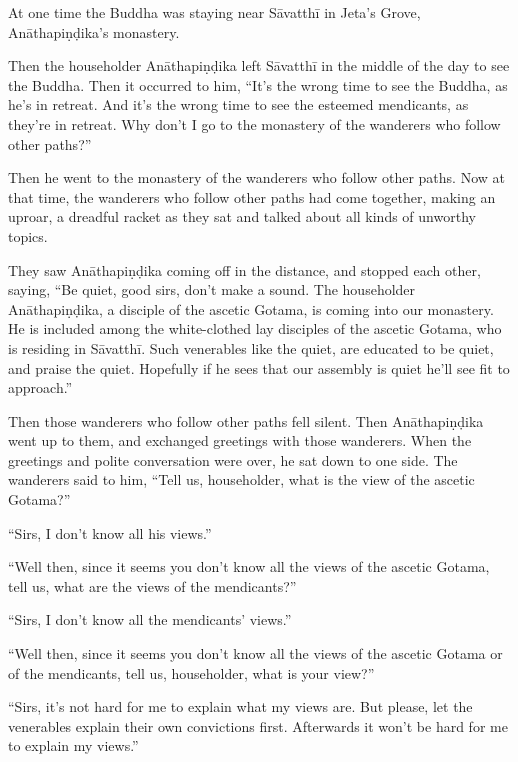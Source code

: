 \documentclass[12pt,openany]{book}%
\begin{document}
At one time the Buddha was staying near \textsanskrit{Sāvatthī} in Jeta’s Grove, \textsanskrit{Anāthapiṇḍika}’s monastery. 

Then the householder \textsanskrit{Anāthapiṇḍika} left \textsanskrit{Sāvatthī} in the middle of the day to see the Buddha. Then it occurred to him, “It’s the wrong time to see the Buddha, as he’s in retreat. And it’s the wrong time to see the esteemed mendicants, as they’re in retreat. Why don’t I go to the monastery of the wanderers who follow other paths?” 

Then he went to the monastery of the wanderers who follow other paths. Now at that time, the wanderers who follow other paths had come together, making an uproar, a dreadful racket as they sat and talked about all kinds of unworthy topics. 

They saw \textsanskrit{Anāthapiṇḍika} coming off in the distance, and stopped each other, saying, “Be quiet, good sirs, don’t make a sound. The householder \textsanskrit{Anāthapiṇḍika}, a disciple of the ascetic Gotama, is coming into our monastery. He is included among the white-clothed lay disciples of the ascetic Gotama, who is residing in \textsanskrit{Sāvatthī}. Such venerables like the quiet, are educated to be quiet, and praise the quiet. Hopefully if he sees that our assembly is quiet he’ll see fit to approach.” 

Then those wanderers who follow other paths fell silent. Then \textsanskrit{Anāthapiṇḍika} went up to them, and exchanged greetings with those wanderers. When the greetings and polite conversation were over, he sat down to one side. The wanderers said to him, “Tell us, householder, what is the view of the ascetic Gotama?” 

“Sirs, I don’t know all his views.” 

“Well then, since it seems you don’t know all the views of the ascetic Gotama, tell us, what are the views of the mendicants?” 

“Sirs, I don’t know all the mendicants’ views.” 

“Well then, since it seems you don’t know all the views of the ascetic Gotama or of the mendicants, tell us, householder, what is your view?” 

“Sirs, it’s not hard for me to explain what my views are. But please, let the venerables explain their own convictions first. Afterwards it won’t be hard for me to explain my views.” 
\end{document}
